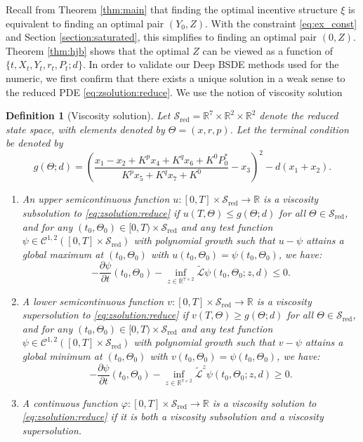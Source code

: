 \documentclass[12pt]{article}
\newtheorem{definition}[theorem2]{Definition}
\begin{document}
Recall from Theorem \ref{thm:main} that finding the optimal incentive structure $\xi$ is equivalent to finding an optimal pair $(Y_0,Z)$. With the constraint \eqref{eq:ex_const} and Section \ref{section:saturated}, this simplifies to finding an optimal pair $(0,Z)$. Theorem \ref{thm:hjb} shows that the optimal $Z$ can be viewed as a function of $\{t,X_t, Y_t, r_t,P_t;d\}$. In order to validate our Deep BSDE methods used for the numeric, we first confirm that there exists a unique solution in a weak sense to the reduced PDE \eqref{eq:zsolution:reduce}. We use the notion of viscosity solution \cite{barles2008second,jing2013regularity}

\begin{definition}[Viscosity solution]
\label{def:viscosity}
Let $\mathcal{S}_{\text{red}} = \mathbb{R}^7 \times \mathbb{R}^2 \times \mathbb{R}^2$ denote the reduced state space, with elements denoted by $\Theta = (x,r,p)$. Let the terminal condition be denoted by \[g(\Theta; d) = \left(\frac{x_1 - x_2 + K^p x_4 + K^q x_6 + K^0 P_0^*}{K^p x_5 + K^q x_7 + K^0} - x_3\right)^2 - d(x_1 + x_2).\]

\begin{enumerate}
    \item An upper semicontinuous function $u: [0,T] \times \mathcal{S}_{\text{red}} \to \mathbb{R}$ is a viscosity subsolution to \eqref{eq:zsolution:reduce} if $u(T,\Theta) \leq g(\Theta; d)$ for all $\Theta \in \mathcal{S}_{\text{red}}$, and for any $(t_0, \Theta_0) \in [0,T) \times \mathcal{S}_{\text{red}}$ and any test function $\psi \in \mathcal{C}^{1,2}([0,T] \times \mathcal{S}_{\text{red}})$ with polynomial growth such that $u - \psi$ attains a global maximum at $(t_0, \Theta_0)$ with $u(t_0, \Theta_0) = \psi(t_0, \Theta_0)$, we have:
    \begin{equation*}
        -\frac{\partial \psi}{\partial t}(t_0, \Theta_0) - \inf_{z\in \mathbb{R}^{7\times 2}} \tilde{\mathcal L}\psi(t_0, \Theta_0; z, d) \leq 0.
    \end{equation*}

    \item A lower semicontinuous function $v: [0,T] \times \mathcal{S}_{\text{red}} \to \mathbb{R}$ is a viscosity supersolution to \eqref{eq:zsolution:reduce} if $v(T,\Theta) \geq g(\Theta; d)$ for all $\Theta \in \mathcal{S}_{\text{red}}$, and for any $(t_0, \Theta_0) \in [0,T) \times \mathcal{S}_{\text{red}}$ and any test function $\psi \in \mathcal{C}^{1,2}([0,T] \times \mathcal{S}_{\text{red}})$ with polynomial growth such that $v - \psi$ attains a global minimum at $(t_0, \Theta_0)$ with $v(t_0, \Theta_0) = \psi(t_0, \Theta_0)$, we have:
    \begin{equation*}
        -\frac{\partial \psi}{\partial t}(t_0, \Theta_0) - \inf_{z\in \mathbb{R}^{7\times 2}} \tilde{\mathcal L}^z\psi(t_0, \Theta_0; z, d) \geq 0.
    \end{equation*}

    \item A continuous function $\varphi: [0,T] \times \mathcal{S}_{\text{red}} \to \mathbb{R}$ is a viscosity solution to \eqref{eq:zsolution:reduce} if it is both a viscosity subsolution and a viscosity supersolution.
\end{enumerate}
\end{definition}
\end{document}
